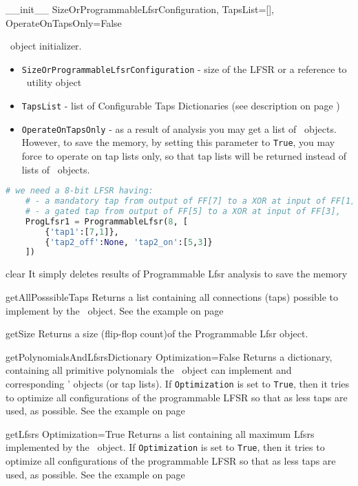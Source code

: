  {\_\_init\_\_} {SizeOrProgrammableLfsrConfiguration, TapsList=[],\\OperateOnTapsOnly=False} {
	\ProgrammableLfsr\ object initializer.
	\begin{itemize}
		\item \texttt{SizeOrProgrammableLfsrConfiguration} - size of the LFSR or a reference to \ProgrammableLfsrConfig\ utility object
		\item \texttt{TapsList} - list of Configurable Taps Dictionaries (see description on page \pageref{configurabletapsdictionary})
		\item \texttt{OperateOnTapsOnly} - as a result of analysis you may get a list of \Lfsr\ objects. However, to save the memory, by setting this parameter to \texttt{True}, you may force to operate on tap lists only, so that tap lists will be returned instead of lists of \Lfsr\ objects.
	\end{itemize}
}
\begin{lstlisting}[language=Python]
	# we need a 8-bit LFSR having:
	# - a mandatory tap from output of FF[7] to a XOR at input of FF[1],
	# - a gated tap from output of FF[5] to a XOR at input of FF[3], 
	ProgLfsr1 = ProgrammableLfsr(8, [
		{'tap1':[7,1]},
		{'tap2_off':None, 'tap2_on':[5,3]}
	])
\end{lstlisting}

 {clear} {} {
	It simply deletes results of Programmable Lfsr analysis to save the memory
}

 {getAllPosssibleTaps} {} {
	Returns a list containing all connections (taps) possible to implement by the \ProgrammableLfsr\ object. 
	See the example on page \pageref{programmablelfsrexample}
}

 {getSize} {} {
	Returns a size (flip-flop count)of the Programmable Lfsr object.
}

 {getPolynomialsAndLfsrsDictionary} {Optimization=False} {
	Returns a dictionary, containing all primitive polynomials the \ProgrammableLfsr\ object can implement and corresponding \Lfsr' objects (or tap lists). If \texttt{Optimization} is set to \texttt{True}, then it tries to optimize all configurations of the programmable LFSR so that as less taps are used, as possible.
	See the example on page \pageref{programmablelfsrexample}
}

 {getLfsrs} {Optimization=True} {
	Returns a list containing all maximum Lfsrs implemented by the \ProgrammableLfsr\ object. If \texttt{Optimization} is set to \texttt{True}, then it tries to optimize all configurations of the programmable LFSR so that as less taps are used, as possible.
	See the example on page \pageref{programmablelfsrexample}
}

